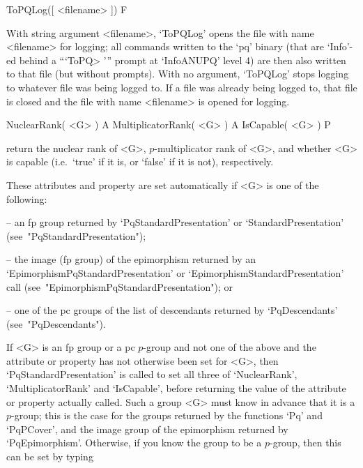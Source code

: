 \>ToPQLog([ <filename> ]) F

With string argument <filename>,  `ToPQLog'  opens  the  file  with  name
<filename> for logging; all commands written to the `pq' binary (that are
`Info'-ed behind a ```ToPQ> ''' prompt at `InfoANUPQ' level 4)  are  then
also written to that  file  (but  without  prompts).  With  no  argument,
`ToPQLog' stops logging to whatever file was being logged to. If  a  file
was already being logged to, that file is closed and the file  with  name
<filename> is opened for logging.


\>NuclearRank( <G> ) A
\>MultiplicatorRank( <G> ) A
\>IsCapable( <G> ) P

return the nuclear rank  of  <G>,  $p$-multiplicator  rank  of  <G>,  and
whether <G> is capable (i.e.~`true' if it is, or `false' if it  is  not),
respectively.

These attributes and property are set automatically if <G> is one of  the
following:

\beginlist%

\item{--}  an  fp   group   returned   by   `PqStandardPresentation'   or
`StandardPresentation' (see~"PqStandardPresentation");

\item{--} the  image  (fp  group)  of  the  epimorphism  returned  by  an
`EpimorphismPqStandardPresentation' or  `EpimorphismStandardPresentation'
call (see~"EpimorphismPqStandardPresentation"); or

\item{--} one of the pc groups of the list  of  descendants  returned  by
`PqDescendants' (see~"PqDescendants").

\endlist

If <G> is an fp group or a pc $p$-group and not one of the above and
the attribute or property has not otherwise been set for <G>, then
`PqStandardPresentation' is called to set all three of `NuclearRank',
`MultiplicatorRank' and `IsCapable', before returning the value of the
attribute or property actually called.  Such a group <G> must know in
advance that it is a $p$-group; this is the case for the groups
returned by the functions `Pq' and `PqPCover', and the image group of
the epimorphism returned by `PqEpimorphism'.  Otherwise, if you know
the group to be a $p$-group, then this can be set by typing 

